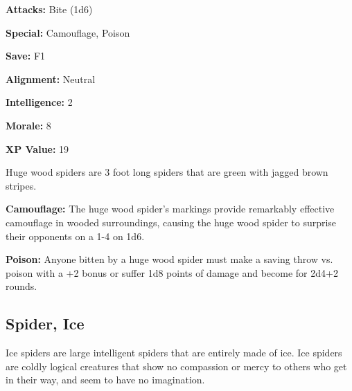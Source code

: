 \begin{multicols*}{2}
{\textbf{Attacks:} Bite (1d6)

\textbf{Special:} Camouflage, Poison

\textbf{Save:} F1

\textbf{Alignment:} Neutral

\textbf{Intelligence:} 2

\textbf{Morale:} 8

\textbf{XP Value:} 19}

Huge wood spiders are 3 foot long spiders that are green with jagged brown stripes.

\textbf{Camouflage:} The huge wood spider's markings provide remarkably effective camouflage in wooded surroundings, causing the huge wood spider to surprise their opponents on a 1-4 on 1d6.

\textbf{Poison:} Anyone bitten by a huge wood spider must make a saving throw vs. poison with a +2 bonus or suffer 1d8 points of damage and become  for 2d4+2 rounds.

\subsection{Spider, Ice}

Ice spiders are large intelligent spiders that are entirely made of ice. Ice spiders are coldly logical creatures that show no compassion or mercy to others who get in their way, and seem to have no imagination.


\end{multicols*}
